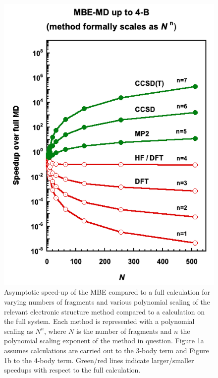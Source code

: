 \begin{figure}[h]
\begin{center}
\begin{minipage}{0.4\textwidth}
\includegraphics[width=\textwidth]{Figures/Chapter_4/ch4_figure_1_right.png}
\end{minipage}
\end{center}
\caption[Asymptotic speed-up of the MBE compared to a full calculation for varying numbers of fragments and various polynomial scaling of the relevant electronic structure method compared to a calculation on the full system. Each method is represented with a polynomial scaling as $N^n$, where $N$ is the number of fragments and $n$ the polynomial scaling exponent of the method in question.]{Asymptotic speed-up of the MBE compared to a full calculation for varying numbers of fragments and various polynomial scaling of the relevant electronic structure method compared to a calculation on the full system. Each method is represented with a polynomial scaling as $N^n$, where $N$ is the number of fragments and $n$ the polynomial scaling exponent of the method in question. Figure 1a assumes calculations are carried out to the 3-body term and Figure 1b to the 4-body term. Green/red lines indicate larger/smaller speedups with respect to the full calculation.}
\label{fig:MBE_MD_F1}
\end{figure}